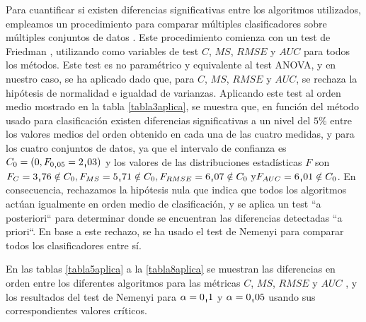 Para cuantificar si existen diferencias significativas entre los algoritmos utilizados,
empleamos un procedimiento para comparar múltiples clasificadores sobre múltiples
conjuntos de datos \cite{Demsar2006}. Este procedimiento comienza con un test de Friedman
\cite{Friedman1940}, utilizando como variables de test $C$, $MS$, $RMSE$ y $AUC$ para
todos los métodos. Este test es no paramétrico y equivalente al test ANOVA, y en
nuestro caso, se ha aplicado dado que, para $C$, $MS$, $RMSE$ y
$AUC$, se rechaza la hipótesis de normalidad e igualdad de varianzas. Aplicando este test
al orden medio mostrado en la tabla \ref{tabla3aplica}, se muestra que, en función del método usado
para clasificación existen diferencias significativas a un nivel del $5\%$ entre los valores medios
del orden obtenido en cada una de las cuatro medidas, y para los cuatro conjuntos de datos, ya
que el intervalo de confianza
es $C_{0}=(0,F_{0\text{\textquotestraightbase}05}=2\text{\textquotestraightbase}03)$ y los valores
de las
distribuciones estadísticas $F$ son $F_{C}=3\text{\textquotestraightbase}76 \notin
C_{0},F_{MS}=5\text{\textquotestraightbase}71 \notin C_{0},
F_{RMSE}=6\text{\textquotestraightbase}07 \notin C_{0} \text{ y}
F_{AUC}=6\text{\textquotestraightbase}01 \notin C_{0}$. En consecuencia, rechazamos la
hipótesis nula que indica que todos los algoritmos actúan igualmente en orden medio de
clasificación, y se aplica un test ``a posteriori`` para determinar donde se encuentran
las diferencias detectadas  ``a priori``. En base a este rechazo, se ha usado el test de
Nemenyi \cite{Zar1996} para comparar todos los clasificadores entre sí.

En las tablas \ref{tabla5aplica} a la \ref{tabla8aplica}
se muestran las diferencias en orden entre los diferentes algoritmos para las métricas $C$, $MS$,
$RMSE$ y $AUC$ , y los resultados del test de Nemenyi para $\alpha=0\text{\textquotestraightbase}1$
y $\alpha=0\text{\textquotestraightbase}05$ usando sus
correspondientes valores críticos.

